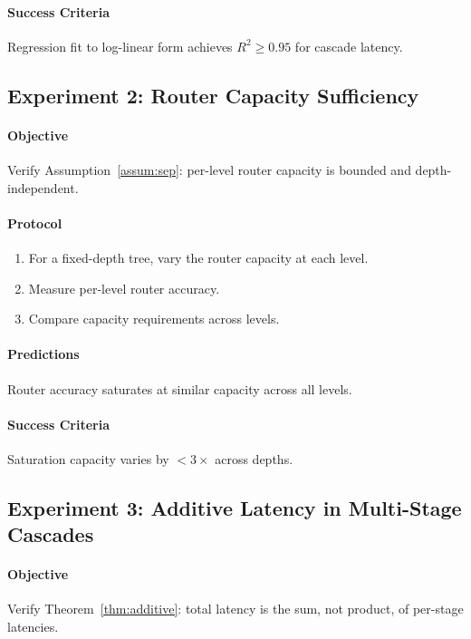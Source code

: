 \documentclass[11pt,twocolumn,a4paper]{article}
\theoremstyle{definition}
\theoremstyle{remark}
\begin{document}
\paragraph{Success Criteria}
Regression fit to log-linear form achieves $R^2 \geq 0.95$ for cascade latency.

\subsection{Experiment 2: Router Capacity Sufficiency}

\paragraph{Objective} Verify Assumption~\ref{assum:sep}: per-level router capacity is bounded and depth-independent.

\paragraph{Protocol}
\begin{enumerate}
    \item For a fixed-depth tree, vary the router capacity at each level.
    \item Measure per-level router accuracy.
    \item Compare capacity requirements across levels.
\end{enumerate}

\paragraph{Predictions}
Router accuracy saturates at similar capacity across all levels.

\paragraph{Success Criteria}
Saturation capacity varies by $< 3\times$ across depths.

\subsection{Experiment 3: Additive Latency in Multi-Stage Cascades}

\paragraph{Objective} Verify Theorem~\ref{thm:additive}: total latency is the sum, not product, of per-stage latencies.
\end{document}
